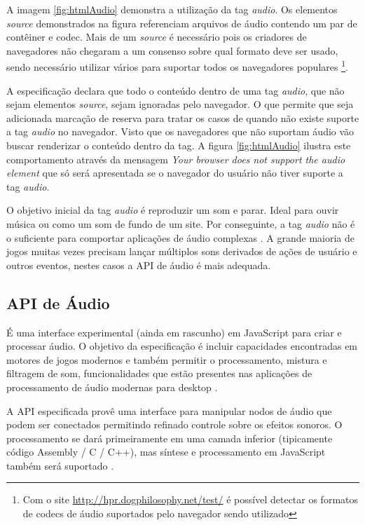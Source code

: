 A imagem \ref{fig:htmlAudio} demonstra a utilização da tag
\textit{audio}. Os elementos \textit{source} demonstrados na figura
referenciam arquivos de áudio contendo um par de contêiner
e codec. Mais de um \textit{source } é necessário pois os
criadores de navegadores não chegaram a um consenso sobre qual
formato deve ser usado, sendo necessário utilizar vários para
suportar todos os navegadores populares \footnote{Com o site
\url{http://hpr.dogphilosophy.net/test/} é possível detectar os
formatos de codecs de áudio suportados pelo navegador sendo utilizado}.

A especificação declara que todo o conteúdo dentro de uma tag
\textit{audio}, que não sejam elementos \textit{source}, sejam
ignoradas pelo navegador. O que permite que seja adicionada marcação
de reserva para tratar os casos de quando não existe suporte a tag
\textit{audio} no navegador. Visto que os navegadores que não suportam
áudio vão buscar renderizar o conteúdo dentro da tag. A figura
\ref{fig:htmlAudio} ilustra este comportamento através da mensagem
\textit{Your browser does not support the audio element } que só
será apresentada se o navegador do usuário não tiver suporte a tag
\textit{audio}.

O objetivo inicial da tag \textit{audio} é reproduzir um som e parar.
Ideal para ouvir música ou como um som de fundo de um site. Por
conseguinte, a tag \textit{audio} não é o suficiente para comportar
aplicações de áudio complexas \autocite{audioApiSpec}. A grande
maioria de jogos muitas vezes precisam lançar múltiplos sons derivados
de ações de usuário e outros eventos, nestes casos a API de áudio é
mais adequada.

\subsection{API de Áudio}

É uma interface experimental (ainda em rascunho) em JavaScript para
criar e processar áudio. O objetivo da especificação é incluir
capacidades encontradas em motores de jogos modernos e também permitir
o processamento, mistura e filtragem de som, funcionalidades que estão
presentes nas aplicações de processamento de áudio modernas para
desktop \autocite{audioApiSpec}.

A API especificada provê uma interface para manipular nodos de
áudio que podem ser conectados permitindo refinado controle sobre os
efeitos sonoros. O processamento se dará primeiramente em uma camada
inferior (tipicamente código Assembly / C / C++), mas síntese e
processamento em JavaScript também será suportado \autocite{audioApiSpec}.

